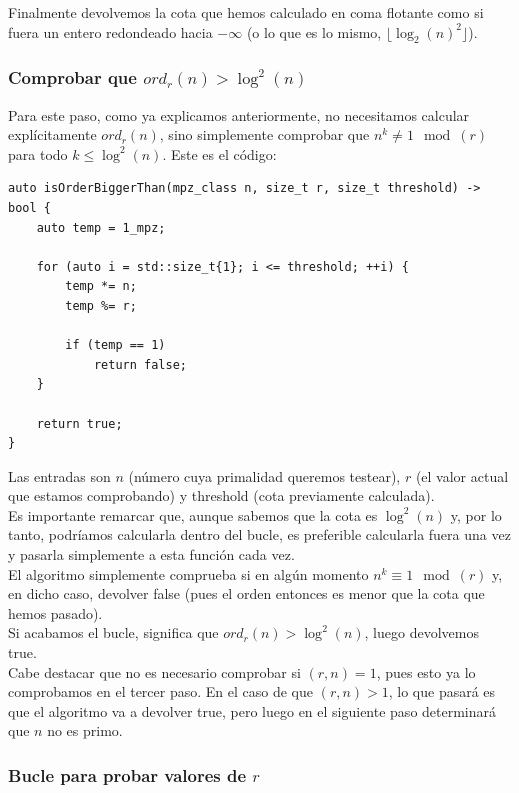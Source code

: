 Finalmente devolvemos la cota que hemos calculado en coma flotante como si fuera un entero redondeado hacia $-\infty$ (o lo que es lo mismo, $\lfloor \log_2(n)^2 \rfloor$).

\subsubsection{Comprobar que $ord_r(n) > \log^2(n)$}

Para este paso, como ya explicamos anteriormente, no necesitamos calcular explícitamente $ord_r(n)$, sino simplemente comprobar que $n^k \neq 1 \mod(r)$ para todo $k \leq \log^2(n)$. Este es el código:\\

\begin{lstlisting}
auto isOrderBiggerThan(mpz_class n, size_t r, size_t threshold) -> bool {
	auto temp = 1_mpz;
	
	for (auto i = std::size_t{1}; i <= threshold; ++i) {
		temp *= n;
		temp %= r;
		
		if (temp == 1)
			return false;
	}
	
	return true;
}
\end{lstlisting}

Las entradas son $n$ (número cuya primalidad queremos testear), $r$ (el valor actual que estamos comprobando) y threshold (cota previamente calculada).\\

Es importante remarcar que, aunque sabemos que la cota es $\log^2(n)$ y, por lo tanto, podríamos calcularla dentro del bucle, es preferible calcularla fuera una vez y pasarla simplemente a esta función cada vez.\\

El algoritmo simplemente comprueba si en algún momento $n^k \equiv 1 \mod(r)$ y, en dicho caso, devolver false (pues el orden entonces es menor que la cota que hemos pasado).\\

Si acabamos el bucle, significa que $ord_r(n) > \log^2(n)$, luego devolvemos true.\\

Cabe destacar que no es necesario comprobar si $(r, n) = 1$, pues esto ya lo comprobamos en el tercer paso. En el caso de que $(r, n) > 1$, lo que pasará es que el algoritmo va a devolver true, pero luego en el siguiente paso determinará que $n$ no es primo.

\subsubsection{Bucle para probar valores de $r$}

